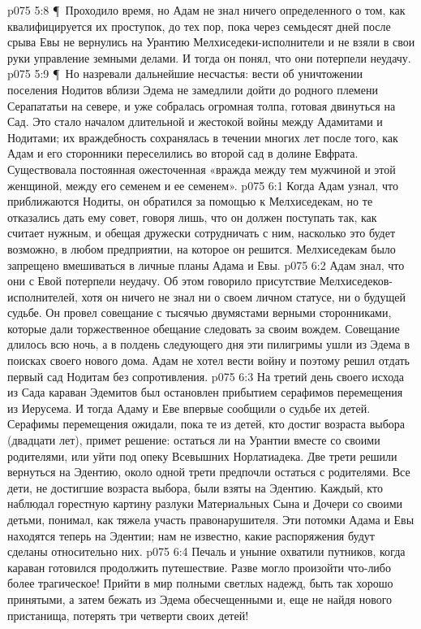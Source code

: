 \vs p075 5:8 \P\ Проходило время, но Адам не знал ничего определенного о том, как квалифицируется их проступок, до тех пор, пока через семьдесят дней после срыва Евы не вернулись на Урантию Мелхиседеки\hyp{}исполнители и не взяли в свои руки управление земными делами. И тогда он понял, что они потерпели неудачу.
\vs p075 5:9 \P\ Но назревали дальнейшие несчастья: вести об уничтожении поселения Нодитов вблизи Эдема не замедлили дойти до родного племени Серапататьи на севере, и уже собралась огромная толпа, готовая двинуться на Сад. Это стало началом длительной и жестокой войны между Адамитами и Нодитами; их враждебность сохранялась в течении многих лет после того, как Адам и его сторонники переселились во второй сад в долине Евфрата. Существовала постоянная ожесточенная «вражда между тем мужчиной и этой женщиной, между его семенем и ее семенем».
\vs p075 6:1 Когда Адам узнал, что приближаются Нодиты, он обратился за помощью к Мелхиседекам, но те отказались дать ему совет, говоря лишь, что он должен поступать так, как считает нужным, и обещая дружески сотрудничать с ним, насколько это будет возможно, в любом предприятии, на которое он решится. Мелхиседекам было запрещено вмешиваться в личные планы Адама и Евы.
\vs p075 6:2 Адам знал, что они с Евой потерпели неудачу. Об этом говорило присутствие Мелхиседеков\hyp{}исполнителей, хотя он ничего не знал ни о своем личном статусе, ни о будущей судьбе. Он провел совещание с тысячью двумястами верными сторонниками, которые дали торжественное обещание следовать за своим вождем. Совещание длилось всю ночь, а в полдень следующего дня эти пилигримы ушли из Эдема в поисках своего нового дома. Адам не хотел вести войну и поэтому решил отдать первый сад Нодитам без сопротивления.
\vs p075 6:3 На третий день своего исхода из Сада караван Эдемитов был остановлен прибытием серафимов перемещения из Иерусема. И тогда Адаму и Еве впервые сообщили о судьбе их детей. Серафимы перемещения ожидали, пока те из детей, кто достиг возраста выбора (двадцати лет), примет решение: остаться ли на Урантии вместе со своими родителями, или уйти под опеку Всевышних Норлатиадека. Две трети решили вернуться на Эдентию, около одной трети предпочли остаться с родителями. Все дети, не достигшие возраста выбора, были взяты на Эдентию. Каждый, кто наблюдал горестную картину разлуки Материальных Сына и Дочери со своими детьми, понимал, как тяжела участь правонарушителя. Эти потомки Адама и Евы находятся теперь на Эдентии; нам не известно, какие распоряжения будут сделаны относительно них.
\vs p075 6:4 Печаль и уныние охватили путников, когда караван готовился продолжить путешествие. Разве могло произойти что\hyp{}либо более трагическое! Прийти в мир полными светлых надежд, быть так хорошо принятыми, а затем бежать из Эдема обесчещенными и, еще не найдя нового пристанища, потерять три четверти своих детей!
